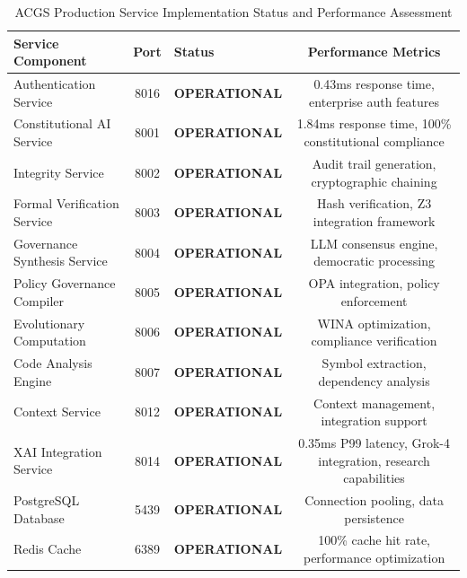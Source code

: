 \documentclass[manuscript,screen,9pt]{acmart}
\newcommand{\tablesize}{\footnotesize}
\newcommand{\tableheader}[1]{\textbf{#1}}
\begin{document}
\begin{table}[!htb]
\centering
\caption{ACGS Production Service Implementation Status and Performance Assessment}
\label{tab:implementation_status}
\tablesize
\begin{tabular}{@{}lclc@{}}
\toprule
\tableheader{Service Component} & \tableheader{Port} & \tableheader{Status} & \tableheader{Performance Metrics} \\
\midrule
Authentication Service & 8016 & \textbf{OPERATIONAL} & 0.43ms response time, enterprise auth features \\
Constitutional AI Service & 8001 & \textbf{OPERATIONAL} & 1.84ms response time, 100\% constitutional compliance \\
Integrity Service & 8002 & \textbf{OPERATIONAL} & Audit trail generation, cryptographic chaining \\
Formal Verification Service & 8003 & \textbf{OPERATIONAL} & Hash verification, Z3 integration framework \\
Governance Synthesis Service & 8004 & \textbf{OPERATIONAL} & LLM consensus engine, democratic processing \\
Policy Governance Compiler & 8005 & \textbf{OPERATIONAL} & OPA integration, policy enforcement \\
Evolutionary Computation & 8006 & \textbf{OPERATIONAL} & WINA optimization, compliance verification \\
Code Analysis Engine & 8007 & \textbf{OPERATIONAL} & Symbol extraction, dependency analysis \\
Context Service & 8012 & \textbf{OPERATIONAL} & Context management, integration support \\
XAI Integration Service & 8014 & \textbf{OPERATIONAL} & 0.35ms P99 latency, Grok-4 integration, research capabilities \\
\midrule
PostgreSQL Database & 5439 & \textbf{OPERATIONAL} & Connection pooling, data persistence \\
Redis Cache & 6389 & \textbf{OPERATIONAL} & 100\% cache hit rate, performance optimization \\
\bottomrule
\end{tabular}
\end{table}
\end{document}

